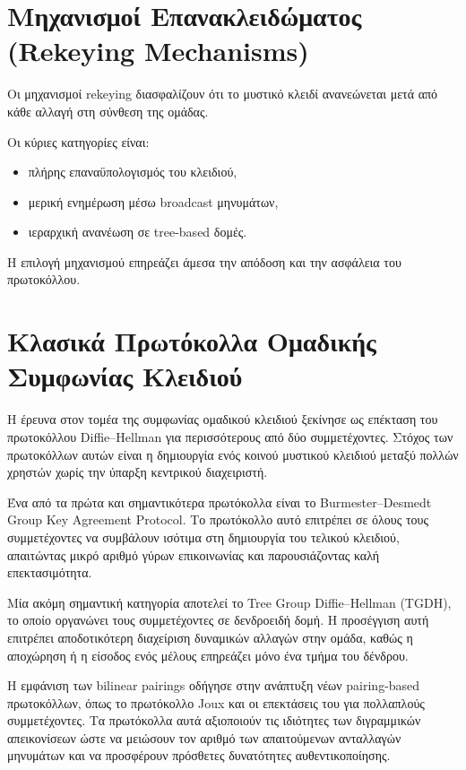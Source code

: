 \documentclass[12pt,a4paper]{report}
\begin{document}
\section{Μηχανισμοί Επανακλειδώματος (Rekeying Mechanisms)}

Οι μηχανισμοί rekeying διασφαλίζουν ότι το μυστικό κλειδί ανανεώνεται μετά από κάθε αλλαγή στη σύνθεση της ομάδας.

Οι κύριες κατηγορίες είναι:
\begin{itemize}
    \item πλήρης επαναϋπολογισμός του κλειδιού,
    \item μερική ενημέρωση μέσω broadcast μηνυμάτων,
    \item ιεραρχική ανανέωση σε tree-based δομές.
\end{itemize}

Η επιλογή μηχανισμού επηρεάζει άμεσα την απόδοση και την ασφάλεια του πρωτοκόλλου.

\section{Κλασικά Πρωτόκολλα Ομαδικής Συμφωνίας Κλειδιού}

Η έρευνα στον τομέα της συμφωνίας ομαδικού κλειδιού ξεκίνησε ως επέκταση του πρωτοκόλλου Diffie--Hellman για περισσότερους από δύο συμμετέχοντες. Στόχος των πρωτοκόλλων αυτών είναι η δημιουργία ενός κοινού μυστικού κλειδιού μεταξύ πολλών χρηστών χωρίς την ύπαρξη κεντρικού διαχειριστή.

Ένα από τα πρώτα και σημαντικότερα πρωτόκολλα είναι το Burmester--Desmedt Group Key Agreement Protocol. Το πρωτόκολλο αυτό επιτρέπει σε όλους τους συμμετέχοντες να συμβάλουν ισότιμα στη δημιουργία του τελικού κλειδιού, απαιτώντας μικρό αριθμό γύρων επικοινωνίας και παρουσιάζοντας καλή επεκτασιμότητα.

Μία ακόμη σημαντική κατηγορία αποτελεί το Tree Group Diffie--Hellman (TGDH), το οποίο οργανώνει τους συμμετέχοντες σε δενδροειδή δομή. Η προσέγγιση αυτή επιτρέπει αποδοτικότερη διαχείριση δυναμικών αλλαγών στην ομάδα, καθώς η αποχώρηση ή η είσοδος ενός μέλους επηρεάζει μόνο ένα τμήμα του δένδρου.

Η εμφάνιση των bilinear pairings οδήγησε στην ανάπτυξη νέων pairing-based πρωτοκόλλων, όπως το πρωτόκολλο Joux και οι επεκτάσεις του για πολλαπλούς συμμετέχοντες. Τα πρωτόκολλα αυτά αξιοποιούν τις ιδιότητες των διγραμμικών απεικονίσεων ώστε να μειώσουν τον αριθμό των απαιτούμενων ανταλλαγών μηνυμάτων και να προσφέρουν πρόσθετες δυνατότητες αυθεντικοποίησης.
\end{document}
